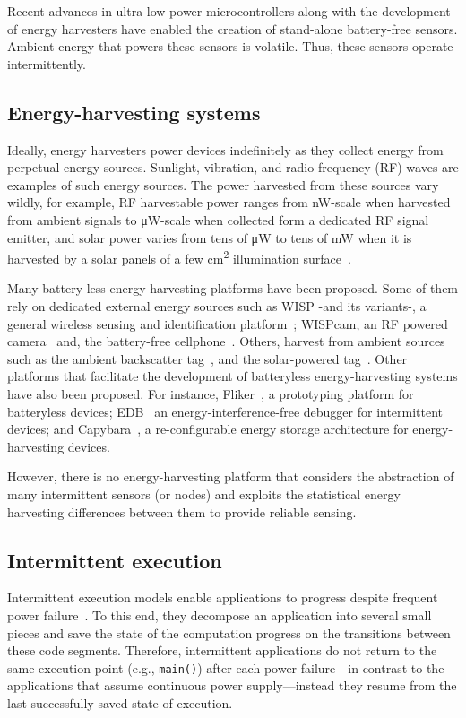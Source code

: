 Recent advances in ultra-low-power microcontrollers along with the development of energy harvesters have enabled the creation of stand-alone battery-free sensors. Ambient energy that powers these sensors is volatile. Thus, these sensors operate intermittently. 
\subsection{Energy-harvesting systems}
Ideally, energy harvesters power devices indefinitely as they collect energy from perpetual energy sources. Sunlight, vibration, and radio frequency (RF) waves are examples of such energy sources. The power harvested from these sources vary wildly, for example, RF harvestable power ranges from
\si{\nano\watt}-scale when harvested from ambient signals to \si{\uW}-scale when collected form a dedicated RF signal emitter, and solar power varies from tens of \si{\uW} to tens of \si{\mW} when it is harvested by a solar panels of a few \si{\cm^2} illumination surface~\cite{lucia2017intermittent,rao2017ambient}.

Many battery-less energy-harvesting platforms have been proposed. Some of them rely on dedicated external energy sources such as WISP -and its variants-, a general wireless sensing and identification platform~\cite{smith_ubicomp_2006,zhao2015nfc,moo}; WISPcam,  an RF powered camera~\cite{naderiparizi_rfid_2015} and, the battery-free cellphone~\cite{talla2017battery}. Others, harvest from ambient sources such as the ambient backscatter tag~\cite{liu2013ambient}, and the solar-powered tag~\cite{majid2019multi}. Other platforms that facilitate the development of batteryless energy-harvesting systems have also been proposed. For instance, Fliker~\cite{flickersensys2017}, a prototyping platform for batteryless devices; EDB~\cite{colin2016energy} an energy-interference-free debugger for intermittent devices;  and Capybara~\cite{colin2018reconfigurable}, a re-configurable energy storage architecture for energy-harvesting devices.

However, there is no energy-harvesting platform that considers the abstraction of many intermittent sensors (or nodes) and exploits the statistical energy harvesting differences between them to provide reliable sensing.

\subsection{Intermittent execution}
Intermittent execution models enable applications to progress despite frequent power failure~\cite{van2016intermittent,colin2016chain,lucia2015simpler,bhatti2017harvos,gobieski2019intelligence}. To this end, they decompose an application into several small pieces and save the state of the computation progress on the transitions between these code segments. Therefore, intermittent applications do not return to the same execution point (e.g., \texttt{main()}) after each power failure---in contrast to the applications that assume continuous power supply---instead they resume from the last successfully saved state of execution.   

